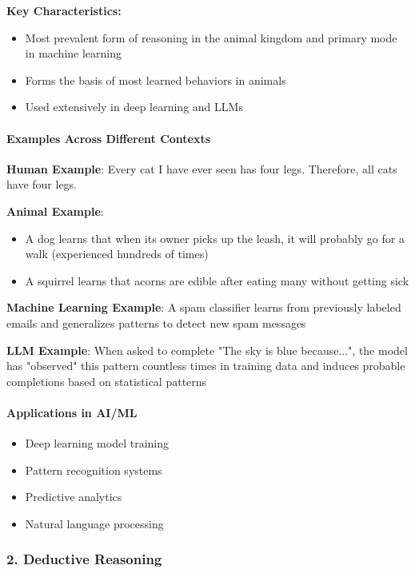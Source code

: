 \textbf{Key Characteristics:}

\begin{itemize}
\item Most prevalent form of reasoning in the animal kingdom and primary mode in machine learning
\item Forms the basis of most learned behaviors in animals  
\item Used extensively in deep learning and LLMs
\end{itemize}

\paragraph{Examples Across Different Contexts}

\textbf{Human Example}: Every cat I have ever seen has four legs. Therefore, all cats have four legs.

\textbf{Animal Example}:

\begin{itemize}
\item A dog learns that when its owner picks up the leash, it will probably go for a walk (experienced hundreds of times)
\item A squirrel learns that acorns are edible after eating many without getting sick
\end{itemize}

\textbf{Machine Learning Example}: A spam classifier learns from previously labeled emails and generalizes patterns to detect new spam messages

\textbf{LLM Example}: When asked to complete "The sky is blue because...", the model has "observed" this pattern countless times in training data and induces probable completions based on statistical patterns

\paragraph{Applications in AI/ML}

\begin{itemize}
\item Deep learning model training
\item Pattern recognition systems
\item Predictive analytics
\item Natural language processing
\end{itemize}

\subsubsection{2. Deductive Reasoning}

